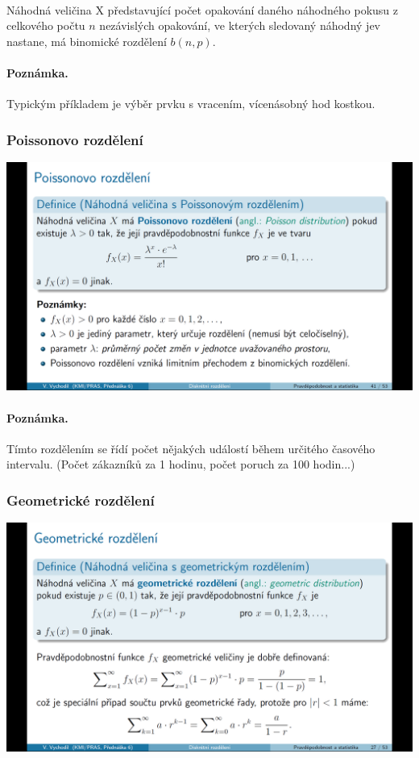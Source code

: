 \documentclass[12pt,a4paper]{article}
\begin{document}
\paragraph{} Náhodná veličina X představující počet opakování daného náhodného pokusu z celkového počtu $n$ nezávislých opakování, ve kterých sledovaný náhodný jev nastane, má binomické rozdělení $b(n, p)$.
\paragraph{Poznámka.} Typickým příkladem je výběr prvku s vracením, vícenásobný hod kostkou.
\newpage
\subsubsection{Poissonovo rozdělení}
\begin{center}
	\includegraphics[scale=0.32]{img/diskretni_rozdeleni_poissonovo}
\end{center}
\paragraph{Poznámka.} Tímto rozdělením se řídí počet nějakých událostí během určitého časového intervalu. (Počet zákazníků za 1 hodinu, počet poruch za 100 hodin...)
\newpage
\subsubsection{Geometrické rozdělení}
\begin{center}
	\includegraphics[scale=0.32]{img/diskretni_rozdeleni_geometricke}
\end{center}
\end{document}
